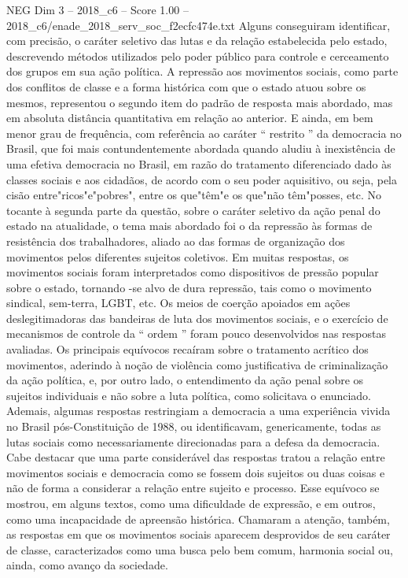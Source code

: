 \begin{textsample}{NEG Dim 3 – 2018\_c6 – Score 1.00 – 2018\_c6/enade\_2018\_serv\_soc\_f2ecfc474e.txt}
Alguns conseguiram identificar, com precisão, o caráter seletivo das lutas e da relação estabelecida pelo estado, descrevendo métodos utilizados pelo poder público para controle e cerceamento dos grupos em sua ação política.
A repressão aos movimentos sociais, como parte dos conflitos de classe e a forma histórica com que o estado atuou sobre os mesmos, representou o segundo item do padrão de resposta mais abordado, mas em absoluta distância quantitativa em relação ao anterior.
E ainda, em bem menor grau de frequência, com referência ao caráter “ restrito ” da democracia no Brasil, que foi mais contundentemente abordada quando aludiu à inexistência de uma efetiva democracia no Brasil, em razão do tratamento diferenciado dado às classes sociais e aos cidadãos, de acordo com o seu poder aquisitivo, ou seja, pela cisão entre"ricos"e"pobres", entre os que"têm"e os que"não têm"posses, etc.
No tocante à segunda parte da questão, sobre o caráter seletivo da ação penal do estado na atualidade, o tema mais abordado foi o da repressão às formas de resistência dos trabalhadores, aliado ao das formas de organização dos movimentos pelos diferentes sujeitos coletivos.
Em muitas respostas, os movimentos sociais foram interpretados como dispositivos de pressão popular sobre o estado, tornando -se alvo de dura repressão, tais como o movimento sindical, sem-terra, LGBT, etc.
Os meios de coerção apoiados em ações deslegitimadoras das bandeiras de luta dos movimentos sociais, e o exercício de mecanismos de controle da “ ordem ” foram pouco desenvolvidos nas respostas avaliadas.
Os principais equívocos recaíram sobre o tratamento acrítico dos movimentos, aderindo à noção de violência como justificativa de criminalização da ação política, e, por outro lado, o entendimento da ação penal sobre os sujeitos individuais e não sobre a luta política, como solicitava o enunciado.
Ademais, algumas respostas restringiam a democracia a uma experiência vivida no Brasil pós-Constituição de 1988, ou identificavam, genericamente, todas as lutas sociais como necessariamente direcionadas para a defesa da democracia.
Cabe destacar que uma parte considerável das respostas tratou a relação entre movimentos sociais e democracia como se fossem dois sujeitos ou duas coisas e não de forma a considerar a relação entre sujeito e processo.
Esse equívoco se mostrou, em alguns textos, como uma dificuldade de expressão, e em outros, como uma incapacidade de apreensão histórica.
Chamaram a atenção, também, as respostas em que os movimentos sociais aparecem desprovidos de seu caráter de classe, caracterizados como uma busca pelo bem comum, harmonia social ou, ainda, como avanço da sociedade.

\end{textsample}
